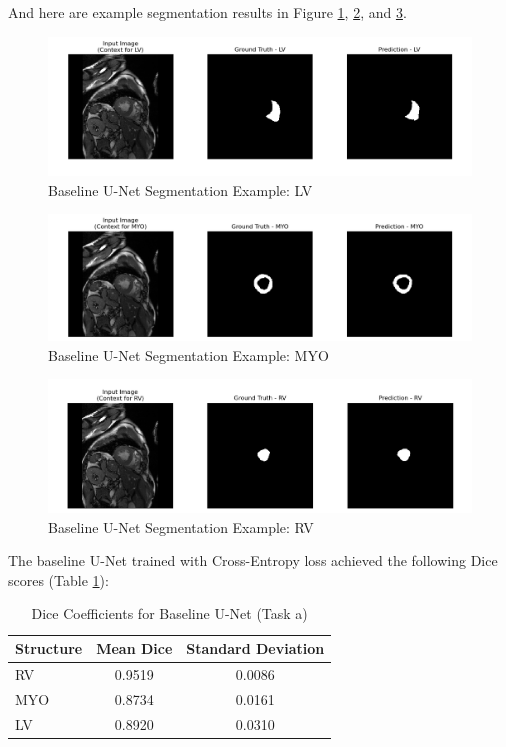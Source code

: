 \documentclass{article}
\begin{document}
And here are example segmentation results in Figure \ref{fig:baseline_unet_segmentation_example_lv},
\ref{fig:baseline_unet_segmentation_example_myo}, and \ref{fig:baseline_unet_segmentation_example_rv}.
\begin{figure}[H]
  \centering
  \includegraphics[width=\linewidth]{../result/for_ppt/baseline_LV.png}
  \caption{Baseline U-Net Segmentation Example: LV}
  \label{fig:baseline_unet_segmentation_example_lv}
\end{figure}
\begin{figure}[H]
  \centering
  \includegraphics[width=\linewidth]{../result/for_ppt/baseline_MYO.png}
  \caption{Baseline U-Net Segmentation Example: MYO}
  \label{fig:baseline_unet_segmentation_example_myo}
\end{figure}
\begin{figure}[H]
  \centering
  \includegraphics[width=\linewidth]{../result/for_ppt/baseline_RV.png}
  \caption{Baseline U-Net Segmentation Example: RV}
  \label{fig:baseline_unet_segmentation_example_rv}
\end{figure}

The baseline U-Net trained with Cross-Entropy loss achieved the following Dice scores (Table \ref{tab:baseline_unet}):
\begin{table}[H]
  \centering
  \caption{Dice Coefficients for Baseline U-Net (Task a)}
  \label{tab:baseline_unet}
  \begin{tabular}{lcc}
    \toprule
    Structure & Mean Dice & Standard Deviation \\
    \midrule
    RV        & 0.9519    & 0.0086             \\
    MYO       & 0.8734    & 0.0161             \\
    LV        & 0.8920    & 0.0310             \\
    \bottomrule
  \end{tabular}
\end{table}
\end{document}
